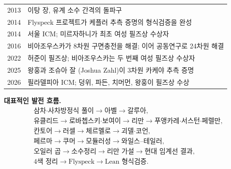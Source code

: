 \begin{center}
\begin{longtable}{@{}L{0.14\textwidth}L{0.78\textwidth}@{}}
2013 & 이탕 장, 유계 소수 간격의 돌파구\\
2014 & Flyspeck 프로젝트가 케플러 추측 증명의 형식검증을 완성\\
2014 & 서울 ICM; 미르자하니가 최초 여성 필즈상 수상자\\
2016 & 비아조우스카가 8차원 구면충전을 해결; 이어 공동연구로 24차원 해결\\
2022 & 허준이 필즈상; 비아조우스카는 두 번째 여성 필즈상 수상자\\
2025 & 왕훙과 조슈아 잘 (Joshua Zahl)이 3차원 카케야 추측 증명\\
2026 & 필라델피아 ICM; 덩위, 파든, 치머먼, 왕훙이 필즈상 수상\\
\end{longtable}
\end{center}

\noindent\textbf{대표적인 발전 흐름.}
\[
\begin{aligned}
&\text{삼차·사차방정식 풀이}\to\text{아벨}\to\text{갈루아},\\
&\text{유클리드}\to\text{로바쳅스키·보여이}\to\text{리만}\to\text{푸앵카레·서스턴·페렐만},\\
&\text{칸토어}\to\text{러셀}\to\text{체르멜로}\to\text{괴델·코언},\\
&\text{페르마}\to\text{쿠머}\to\text{모듈러성}\to\text{와일스--테일러},\\
&\text{오일러 곱}\to\text{소수정리}\to\text{리만 가설}\to\text{현대 임계선 결과},\\
&\text{4색 정리}\to\text{Flyspeck}\to\text{Lean 형식검증}.
\end{aligned}
\]


